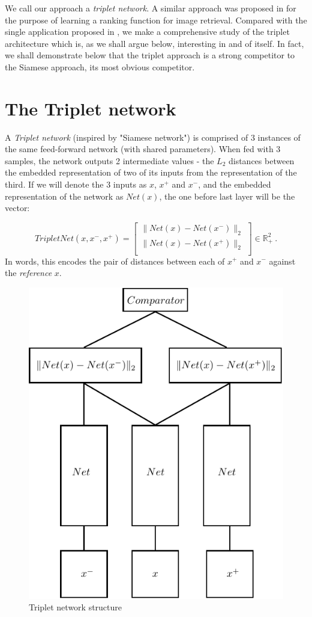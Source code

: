 \documentclass{article} %
\begin{document}
We call our approach a \emph{triplet network}.
A similar approach  was proposed in  \cite{WangSLRWPCW2014} for the purpose of learning a ranking function for
image retrieval.  Compared with the single application proposed in  \cite{WangSLRWPCW2014}, we make a comprehensive
study of the  triplet architecture which is, as we shall argue below, interesting in and of itself.
In fact, we shall demonstrate below that the triplet approach  is a strong competitor to the Siamese approach, its
most obvious competitor.

\section{The Triplet network}
A \emph{Triplet network} (inspired by "Siamese network") is comprised of 3 instances of the same feed-forward network (with shared parameters).
When fed with 3 samples, the network
outputs 2 intermediate values - the $L_2$ distances between the embedded representation of two of its inputs from the representation of the third. 
If we will denote the 3 inputs as $x$, $x^{+}$ and $x^{-}$, and the
embedded representation of the network as $Net(x)$, the one before last layer  will be the vector:

\begin{equation*}
    TripletNet(x,x^{-},x^{+})= \begin{bmatrix}
                       \|Net(x)-Net(x^{-})\|_2 \\[0.3em]
                      \|Net(x)-Net(x^{+})\|_2 \\

                      \end{bmatrix} \in \mathbb{R}_{+}^2\ .
\end{equation*}
In words, this encodes the pair of distances between each of $x^+$ and $x^-$ against the \emph{reference} $x$.
\begin{figure}[h]
\begin{center}
\includegraphics[width=0.5\linewidth]{TripletNet_scheme.pdf}
\end{center}
   \caption{Triplet network structure }\label{tripletnet_scheme}
\end{figure}
\end{document}
